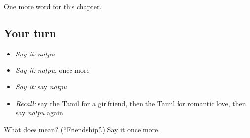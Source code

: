 \begin{grammarlens}[title={What you've built}]
One more word for this chapter.
\end{grammarlens}

\subsection*{Your turn}
\begin{itemize}
\raggedright
  \item \emph{Say it:} \emph{naṭpu}
  \item \emph{Say it:} \emph{naṭpu}, once more
  \item \emph{Say it:} say \emph{naṭpu}
  \item \emph{Recall:} say the Tamil for a girlfriend, then the Tamil for romantic love, then say \emph{naṭpu} again
\end{itemize}

\begin{tcolorbox}[breakable,colback=teal!4,colframe=teal!35!black,title={Before you move on}]
What does  mean? (\textquotedblleft{}Friendship\textquotedblright{}.) Say it once more.
\end{tcolorbox}
